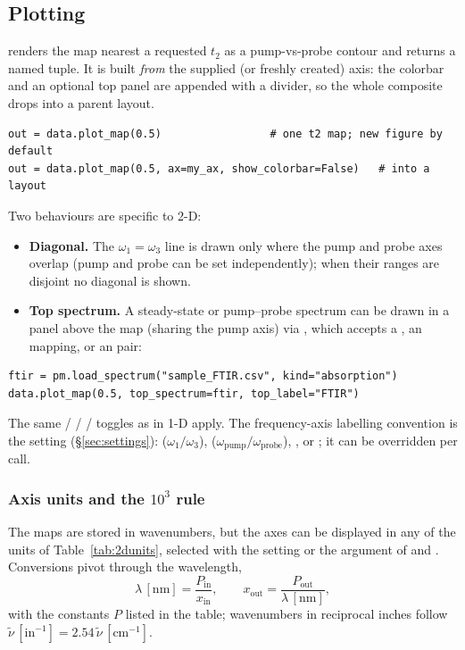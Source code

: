 \subsection{Plotting}
 renders the map nearest a requested $t_2$ as a pump-vs-probe
contour and returns a  named tuple. It is built
\emph{from} the supplied (or freshly created) axis: the colorbar and an optional
top panel are appended with a divider, so the whole composite drops into a
parent layout.

\begin{lstlisting}
out = data.plot_map(0.5)                 # one t2 map; new figure by default
out = data.plot_map(0.5, ax=my_ax, show_colorbar=False)   # into a layout
\end{lstlisting}

Two behaviours are specific to 2-D:
\begin{itemize}
  \item \textbf{Diagonal.} The $\omega_1 = \omega_3$ line is drawn only where the
        pump and probe axes overlap (pump and probe can be set independently);
        when their ranges are disjoint no diagonal is shown.
  \item \textbf{Top spectrum.} A steady-state or pump--probe spectrum can be drawn
        in a panel above the map (sharing the pump axis) via ,
        which accepts a , an  mapping, or an
         pair:
\end{itemize}

\begin{lstlisting}
ftir = pm.load_spectrum("sample_FTIR.csv", kind="absorption")
data.plot_map(0.5, top_spectrum=ftir, top_label="FTIR")
\end{lstlisting}

The same  /  /  /
 toggles as in 1-D apply. The frequency-axis
labelling convention is the  setting
(\S\ref{sec:settings}):  ($\omega_1/\omega_3$), 
($\omega_{\text{pump}}/\omega_{\text{probe}}$), , or
; it can be overridden per call.

\subsubsection{Axis units and the $10^3$ rule}\label{sec:twoD:units}
The maps are stored in wavenumbers, but the axes can be displayed in any of the
units of Table~\ref{tab:2dunits}, selected with the 
setting or the  argument of  and
. Conversions pivot through the wavelength,
\begin{equation}
  \lambda\,[\mathrm{nm}] = \frac{P_{\text{in}}}{x_{\text{in}}},
  \qquad
  x_{\text{out}} = \frac{P_{\text{out}}}{\lambda\,[\mathrm{nm}]},
\end{equation}
with the constants $P$ listed in the table; wavenumbers in reciprocal inches
follow $\tilde\nu\,[\mathrm{in}^{-1}] = 2.54\,\tilde\nu\,[\mathrm{cm}^{-1}]$.


